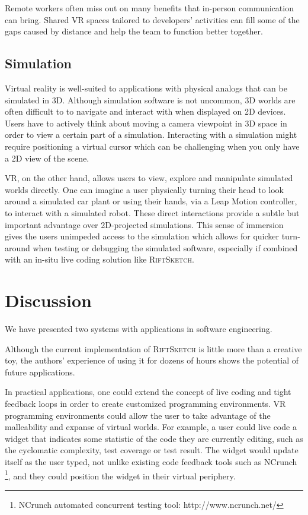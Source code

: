 \documentclass[conference]{IEEEtran}
\begin{document}
Remote workers often miss out on many benefits that in-person communication can bring. 
Shared VR spaces tailored to developers' activities can fill some of the gaps caused by distance and help the team to function better together. 

\subsection{Simulation}
Virtual reality is well-suited to applications with physical analogs that can be simulated in 3D. 
Although simulation software is not uncommon, 3D worlds are often difficult to to navigate and interact with when displayed on 2D devices. 
Users have to actively think about moving a camera viewpoint in 3D space in order to view a certain part of a simulation. 
Interacting with a simulation might require positioning a virtual cursor which can be challenging when you only have a 2D view of the scene. 

VR, on the other hand, allows users to view, explore and manipulate simulated worlds directly. One can imagine a user physically turning their head to look around a simulated car plant or using their hands, via a Leap Motion controller, to interact with a simulated robot. 
These direct interactions provide a subtle but important advantage over 2D-projected simulations. 
This sense of immersion gives the users unimpeded access to the simulation which allows for quicker turn-around when testing or debugging the simulated software, especially if combined with an in-situ live coding solution like \textsc{RiftSketch}.

\section{Discussion}
We have presented two systems with applications in software engineering.

Although the current implementation of \textsc{RiftSketch} is little more than a creative toy, the authors' experience of using it for dozens of hours shows the potential of future applications. 

In practical applications, one could extend the concept of live coding and tight feedback loops in order to create customized programming environments. 
VR programming environments could allow the user to take advantage of the malleability and expanse of virtual worlds. 
For example, a user could live code a widget that indicates some statistic of the code they are currently editing, such as the cyclomatic complexity, test coverage or test result. 
The widget would update itself as the user typed, not unlike existing code feedback tools such as NCrunch \footnote{NCrunch automated concurrent testing tool: http://www.ncrunch.net/}, and they could position the widget in their virtual periphery.
\end{document}
